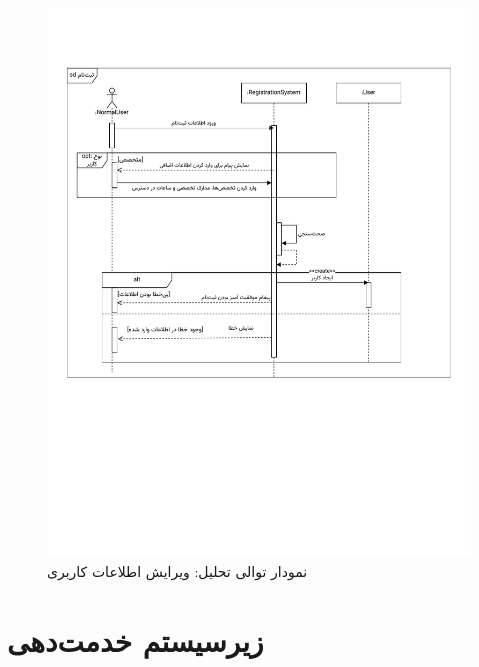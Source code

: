 \begin{figure}[ht!]
	\centering
	\includegraphics[scale=0.8, page=8]{figs/OOD-Sequence-1.pdf}
	\caption{نمودار توالی تحلیل: ویرایش اطلاعات کاربری}
\end{figure}
\FloatBarrier
\newpage


\section{زیرسیستم خدمت‌دهی}


